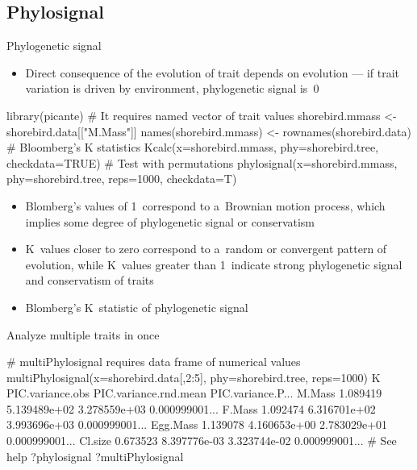 \documentclass[compress, ucs, xelatex, 11pt, xcolor=svgnames, aspectratio=169,
	hyperref={
		bookmarks=true,
		unicode=true,
		colorlinks=true,
		pdftitle={Molecular data in R},
		plainpages=false,
		pdfauthor={Vojtech Zeisek},
		pdfsubject={Course about phylogeny and evolution in R},
		pdfcreator={XeLaTeX},
		pdfkeywords={R, evolution, phylogeny, molecular data},
		linkcolor=Crimson, %
		anchorcolor=Magenta, %
		citecolor=Magenta, %
		filecolor=Magenta, %
		menucolor=Magenta, %
		urlcolor=DodgerBlue, %
		pdftex},
	url={hyphens, lowtilde} %
	]{beamer}
\begin{document}
%
%

\subsection{Phylosignal}

\begin{frame}[fragile]{Phylogenetic signal}
	\begin{itemize}
		\item Direct consequence of the evolution of trait depends on evolution --- if trait variation is driven by environment, phylogenetic signal is~0
	\end{itemize}
	\begin{spluscode}
    library(picante)
    # It requires named vector of trait values
    shorebird.mmass <- shorebird.data[["M.Mass"]]
    names(shorebird.mmass) <- rownames(shorebird.data)
    # Bloomberg's K statistics
    Kcalc(x=shorebird.mmass, phy=shorebird.tree, checkdata=TRUE)
    # Test with permutations
    phylosignal(x=shorebird.mmass, phy=shorebird.tree, reps=1000, checkdata=T)
\end{spluscode}
	\begin{itemize}
		\item Blomberg's values of 1~correspond to a~Brownian motion process, which implies some degree of phylogenetic signal or conservatism
		\item K~values closer to zero correspond to a~random or convergent pattern of evolution, while K~values greater than 1~indicate strong phylogenetic signal and conservatism of traits
		\item Blomberg's K~statistic of phylogenetic signal
	\end{itemize}
\end{frame}

\begin{frame}[fragile]{Analyze multiple traits in once}
	\begin{spluscode}
    # multiPhylosignal requires data frame of numerical values
    multiPhylosignal(x=shorebird.data[,2:5], phy=shorebird.tree, reps=1000)
                    K PIC.variance.obs PIC.variance.rnd.mean PIC.variance.P...
    M.Mass   1.089419     5.139489e+02          3.278559e+03    0.000999001...
    F.Mass   1.092474     6.316701e+02          3.993696e+03    0.000999001...
    Egg.Mass 1.139078     4.160653e+00          2.783029e+01    0.000999001...
    Cl.size  0.673523     8.397776e-03          3.323744e-02    0.000999001...
    # See help
    ?phylosignal
    ?multiPhylosignal
	\end{spluscode}
\end{frame}
\end{document}
